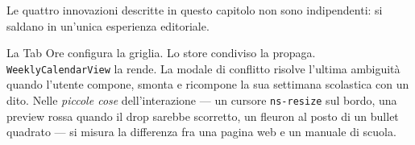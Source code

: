 Le quattro innovazioni descritte in questo capitolo non sono
indipendenti: si saldano in un'unica esperienza editoriale.

\fleuron

La Tab Ore configura la griglia. Lo store condiviso la propaga.
\texttt{WeeklyCalendarView} la rende. La modale di conflitto
risolve l'ultima ambiguit\`a quando l'utente compone, smonta e
ricompone la sua settimana scolastica con un dito.
Nelle \emph{piccole cose} dell'interazione --- un cursore
\texttt{ns-resize} sul bordo, una preview rossa quando il drop
sarebbe scorretto, un fleuron al posto di un bullet quadrato ---
si misura la differenza fra una pagina web e un manuale di
scuola.
